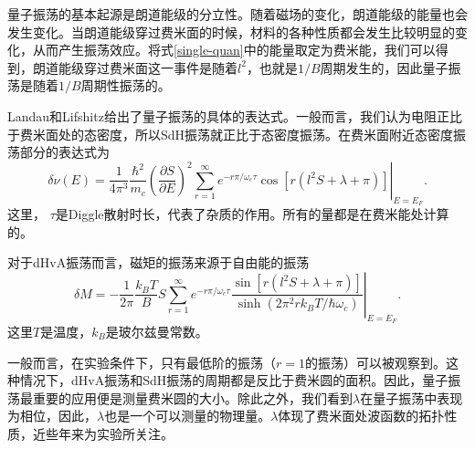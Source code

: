 量子振荡的基本起源是朗道能级的分立性。随着磁场的变化，朗道能级的能量也会发生变化。当朗道能级穿过费米面的时候，材料的各种性质都会发生比较明显的变化，从而产生振荡效应。将式\ref{single-quan}中的能量取定为费米能，我们可以得到，朗道能级穿过费米面这一事件是随着$l^2$，也就是$1/B$周期发生的，因此量子振荡是随着$1/B$周期性振荡的。

Landau和Lifshitz给出了量子振荡的具体的表达式。一般而言，我们认为电阻正比于费米面处的态密度，所以SdH振荡就正比于态密度振荡。在费米面附近态密度振荡部分的表达式为
\begin{equation}
\delta\nu (E) = \left. \frac{1}{4\pi^3}\frac{\hbar^2}{m_c}\left(\frac{\partial S}{\partial E}\right)^2\sum_{r=1}^{\infty} e^{-r\pi/\omega_c\tau}
\cos [r(l^2 S+\lambda+\pi)] \right|_{E=E_F}.
\end{equation}
这里， $\tau$是Diggle散射时长，代表了杂质的作用。所有的量都是在费米能处计算的。

对于dHvA振荡而言，磁矩的振荡来源于自由能的振荡
\begin{equation}
\delta M = \left. -\frac{1}{2\pi}\frac{k_B T}{B} S\sum_{r=1}^{\infty}e^{-r\pi/\omega_c\tau}\frac{\sin[r(l^2 S+\lambda+\pi)]}{\sinh(2\pi^2 r k_B T/\hbar \omega_c)}\right|_{E=E_F}.
\end{equation}
这里$T$是温度，$k_B$是玻尔兹曼常数。

一般而言，在实验条件下，只有最低阶的振荡（$r=1$的振荡）可以被观察到。这种情况下，dHvA振荡和SdH振荡的周期都是反比于费米圆的面积。因此，量子振荡最重要的应用便是测量费米圆的大小。除此之外，我们看到$\lambda$在量子振荡中表现为相位，因此，$\lambda$也是一个可以测量的物理量。$\lambda$体现了费米面处波函数的拓扑性质，近些年来为实验所关注。